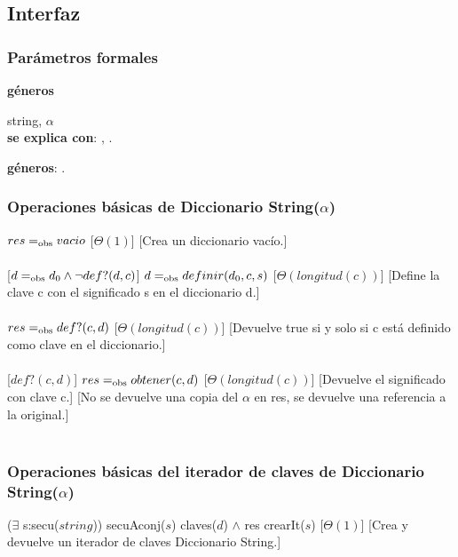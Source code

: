 \subsection{Interfaz}

  \subsubsection{Par\'ametros formales}
   \parbox{1.7cm}{\textbf{g\'eneros}} string, $\alpha$\\

  \textbf{se explica con}: , .

  \textbf{g\'eneros}: . %

  \subsubsection{Operaciones b\'asicas de Diccionario String($\alpha$)}
  {$res =_{\mathrm{obs}} vacio$}%
  [$\Theta(1)$]
  [Crea un diccionario vac\'io.]\\\\
  [$d =_{\mathrm{obs}} d_0 \wedge \neg def?(d,c)$]
  {$d =_{\mathrm{obs}} definir(d_0,c,s)$}%
  [$\Theta(longitud(c))$]
  [Define la clave c con el significado s en el diccionario d.]\\\\
  {$res =_{\mathrm{obs}} def?(c,d)$}%
  [$\Theta(longitud(c))$]
  [Devuelve true si y solo si c est\'a definido como clave en el diccionario.]\\\\
  [$def?(c,d)$]
  {$res =_{\mathrm{obs}} obtener(c,d)$}%
  [$\Theta(longitud(c))$]
  [Devuelve el significado con clave c.]
  [No se devuelve una copia del $\alpha$ en res, se devuelve una referencia a la original.]\\\\

 \subsubsection{Operaciones b\'asicas del iterador de claves de Diccionario String($\alpha$)}
  {($\exists$ s:secu($string$)) secuAconj($s$) \igobs claves($d$) $\land$ res \igobs crearIt($s$)}
  [$\Theta(1)$]
  [Crea y devuelve un iterador de claves Diccionario String.]\\\\

